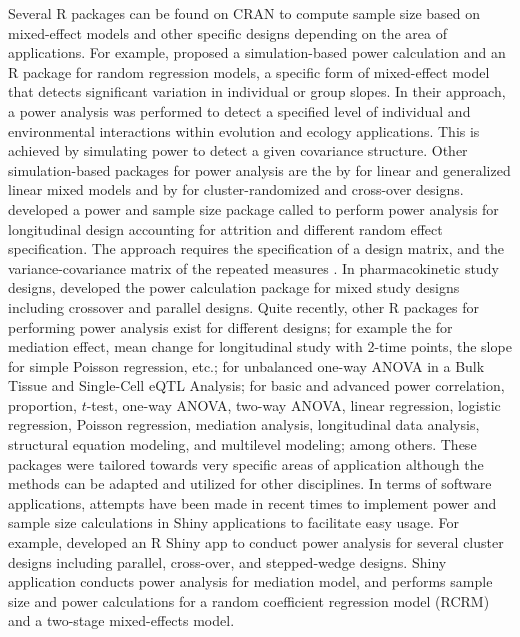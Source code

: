 Several R packages can be found on CRAN to compute sample size based on mixed-effect models and other specific designs depending on the area of applications. For example, \cite{Martin_etal(2011)} proposed a simulation-based power calculation and an R package  for random regression models, a specific form of mixed-effect model that detects significant variation in individual or group slopes. In their approach, a power analysis was performed to detect a specified level of individual and environmental interactions within evolution and ecology applications. This is achieved by simulating power to detect a given covariance structure. Other simulation-based packages for power analysis are the  by \cite{Green_MacLeod(2016)} for linear and generalized linear mixed models and  by \cite{Kleinman(2021)} for cluster-randomized and cross-over designs. \cite{Schoenfeld(2019)} developed a power and sample size package called  \citep{Diggle_Liang_Zeger(1994)} to perform power analysis for longitudinal design accounting for attrition and different random effect specification. The approach requires the specification of a design matrix, and the variance-covariance matrix of the repeated measures \citep{Yi_Panzarella(2002)}. In pharmacokinetic study designs, \cite{Kloprogge_Tarning(2015)} developed the  power calculation package for mixed study designs including crossover and parallel designs. Quite recently, other R packages for performing power analysis exist for different designs; for example the  \citep{Qiu(2021)} for mediation effect, mean change for longitudinal study with 2-time points, the slope for simple Poisson regression, etc.;  \citep{Dong_etal(2021)} for unbalanced one-way ANOVA in a Bulk Tissue and Single-Cell eQTL Analysis;   \citep{Zhang_Mai_Yang(2021)} for basic and advanced power correlation, proportion, $t$-test, one-way ANOVA, two-way ANOVA, linear regression, logistic regression, Poisson regression, mediation analysis, longitudinal data analysis, structural equation modeling, and multilevel modeling; among others. These packages were tailored towards very specific areas of application although the methods can be adapted and utilized for other disciplines. In terms of software applications, attempts have been made in recent times to implement power and sample size calculations in Shiny applications to facilitate easy usage. For example, \cite{Hemming_etal(2020)} developed an R Shiny app to conduct power analysis for several cluster designs including parallel, cross-over, and stepped-wedge designs. \cite{Schoemann_Boulton_Short(2017)} Shiny application conducts power analysis for mediation model, and \cite{Hu_Qu(2021)} performs sample size and power calculations for a random coefficient regression model (RCRM) and a two-stage mixed-effects model.

